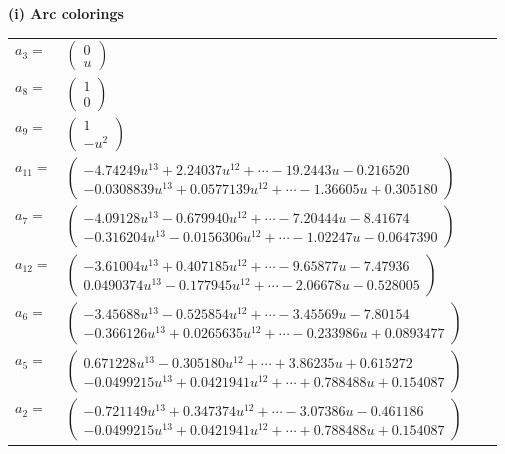 \documentclass[1p]{elsarticle_modified}
\theoremstyle{definition}
\begin{document}
\flushleft \textbf{(i) Arc colorings}\\
\begin{tabular}{m{7pt} m{180pt} m{7pt} m{180pt} }
\flushright $a_{3}=$&$\begin{pmatrix}0\\u\end{pmatrix}$ \\
\flushright $a_{8}=$&$\begin{pmatrix}1\\0\end{pmatrix}$ \\
\flushright $a_{9}=$&$\begin{pmatrix}1\\- u^2\end{pmatrix}$ \\
\flushright $a_{11}=$&$\begin{pmatrix}-4.74249 u^{13}+2.24037 u^{12}+\cdots-19.2443 u-0.216520\\-0.0308839 u^{13}+0.0577139 u^{12}+\cdots-1.36605 u+0.305180\end{pmatrix}$ \\
\flushright $a_{7}=$&$\begin{pmatrix}-4.09128 u^{13}-0.679940 u^{12}+\cdots-7.20444 u-8.41674\\-0.316204 u^{13}-0.0156306 u^{12}+\cdots-1.02247 u-0.0647390\end{pmatrix}$ \\
\flushright $a_{12}=$&$\begin{pmatrix}-3.61004 u^{13}+0.407185 u^{12}+\cdots-9.65877 u-7.47936\\0.0490374 u^{13}-0.177945 u^{12}+\cdots-2.06678 u-0.528005\end{pmatrix}$ \\
\flushright $a_{6}=$&$\begin{pmatrix}-3.45688 u^{13}-0.525854 u^{12}+\cdots-3.45569 u-7.80154\\-0.366126 u^{13}+0.0265635 u^{12}+\cdots-0.233986 u+0.0893477\end{pmatrix}$ \\
\flushright $a_{5}=$&$\begin{pmatrix}0.671228 u^{13}-0.305180 u^{12}+\cdots+3.86235 u+0.615272\\-0.0499215 u^{13}+0.0421941 u^{12}+\cdots+0.788488 u+0.154087\end{pmatrix}$ \\
\flushright $a_{2}=$&$\begin{pmatrix}-0.721149 u^{13}+0.347374 u^{12}+\cdots-3.07386 u-0.461186\\-0.0499215 u^{13}+0.0421941 u^{12}+\cdots+0.788488 u+0.154087\end{pmatrix}$ \\

\end{tabular}
\end{document}
